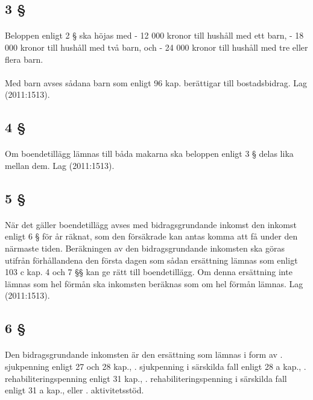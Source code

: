 \documentclass[a4paper,notitlepage,openany,10pt]{book}
\begin{document}
\subsection*{3 §}
\paragraph*{}
Beloppen enligt 2 § ska höjas med
\newline - 12 000 kronor till hushåll med ett barn,
\newline - 18 000 kronor till hushåll med två barn, och
\newline - 24 000 kronor till hushåll med tre eller flera barn.
\paragraph*{}
Med barn avses sådana barn som enligt 96 kap. berättigar till bostadsbidrag.
Lag (2011:1513).
\subsection*{4 §}
\paragraph*{}
Om boendetillägg lämnas till båda makarna ska beloppen enligt 3 § delas lika mellan dem.
Lag (2011:1513).
\subsection*{5 §}
\paragraph*{}
När det gäller boendetillägg avses med bidragsgrundande inkomst den inkomst enligt 6 § för år räknat, som den försäkrade kan antas komma att få under den närmaste tiden.
Beräkningen av den bidragsgrundande inkomsten ska göras utifrån förhållandena den första dagen som sådan ersättning lämnas som enligt 103 c kap. 4 och 7 §§ kan ge rätt till boendetillägg. Om denna ersättning inte lämnas som hel förmån ska inkomsten beräknas som om hel förmån lämnas.
Lag (2011:1513).
\subsection*{6 §}
\paragraph*{}
Den bidragsgrundande inkomsten är den ersättning som lämnas i form av
. sjukpenning enligt 27 och 28 kap.,
. sjukpenning i särskilda fall enligt 28 a kap.,
. rehabiliteringspenning enligt 31 kap.,
. rehabiliteringspenning i särskilda fall enligt 31 a kap., eller
. aktivitetsstöd.
\end{document}
